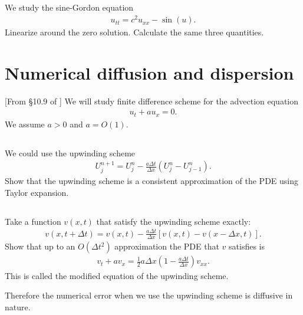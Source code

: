 \documentclass[11pt,letterpaper]{article}
\begin{document}
\subsection{}
We study the sine-Gordon equation
\begin{align}
    u_{tt} = c^2u_{xx}-\sin(u).
\end{align}
Linearize around the zero solution. Calculate the same three quantities.

\section{Numerical diffusion and dispersion}
[From \S 10.9 of \cite{LeVeque_07}] We will study finite difference scheme for the advection equation
\begin{align}
    u_t+au_x = 0.
\end{align}
We assume $a>0$ and $a=O(1)$. 

\subsection{}
We could use the upwinding scheme
\begin{align}
    U^{n+1}_j = U^n_j-\frac{a\Delta t}{\Delta x}\left( U^n_j-U^n_{j-1} \right).
\end{align}
Show that the upwinding scheme is a consistent approximation of the PDE using Taylor expansion. 

\subsection{}
Take a function $v(x,t)$ that satisfy the upwinding scheme exactly:
\begin{align}
    v(x,t+\Delta t)=v(x,t)-\frac{a\Delta t}{\Delta x}\left[v(x,t)-v(x-\Delta x,t)\right].
\end{align}
Show that up to an $O(\Delta t^2)$ approximation the PDE that $v$ satisfies is
\begin{align}
    v_t+av_x = \frac{1}{2}a\Delta x\left(1-\frac{a\Delta t}{\Delta x}\right)v_{xx}.
\end{align}
This is called the modified equation of the upwinding scheme.

Therefore the numerical error when we use the upwinding scheme is diffusive in nature.
\end{document}
